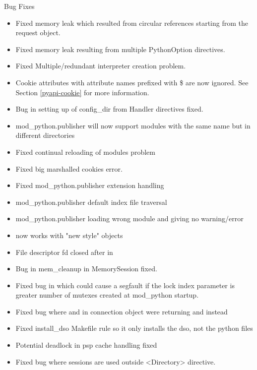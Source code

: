   Bug Fixes

  \begin{itemize}
    \item
      Fixed memory leak which resulted from circular references starting 
      from the request object.
    \item
      Fixed memory leak resulting from multiple PythonOption directives. 
    \item
      Fixed Multiple/redundant interpreter creation problem.
    \item
      Cookie attributes  with attribute names prefixed with 
      \$ are now ignored. See Section \ref{pyapi-cookie} for more 
      information.
    \item
      Bug in setting up of config_dir from Handler directives fixed.
    \item
      mod_python.publisher will now support modules with the same name
      but in different directories
    \item
      Fixed continual reloading of modules problem
    \item
      Fixed big marshalled cookies error.
    \item
      Fixed mod_python.publisher extension handling
    \item
      mod_python.publisher default index file traversal
    \item
      mod_python.publisher loading wrong module and giving no
      warning/error
    \item
       now works with "new style" objects
    \item
      File descriptor fd closed after  in 
    \item
      Bug in mem_cleanup in MemorySession fixed.
    \item
      Fixed bug in  which could cause a segfault 
      if the lock index parameter is greater number of mutexes created
      at mod_python startup.
    \item
      Fixed bug where  and  in connection object 
      were returning  and  instead
    \item
      Fixed install_dso Makefile rule so it only installs the dso, not the
      python files
    \item
      Potential deadlock in psp cache handling fixed
    \item
      Fixed bug where sessions are used outside <Directory> directive.

\end{itemize}
